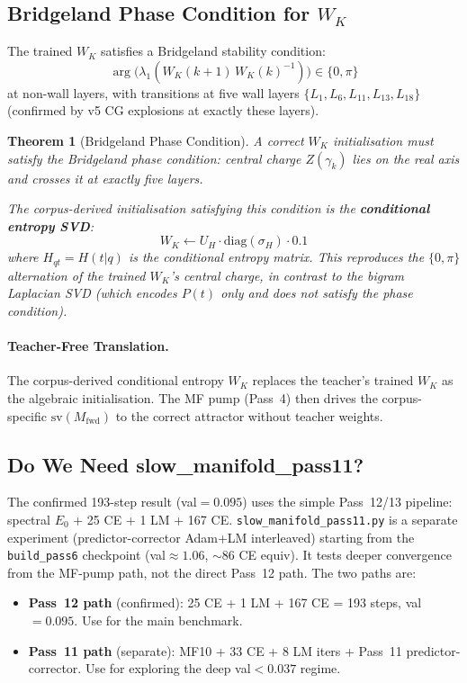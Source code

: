 \documentclass[11pt]{amsart}
\newtheorem{theorem}{Theorem}[section]
\begin{document}
\subsection{Bridgeland Phase Condition for $W_K$}

The trained $W_K$ satisfies a Bridgeland stability condition:
\[
  \arg\!\bigl(\lambda_1(W_K(k{+}1)\,W_K(k)^{-1})\bigr) \in \{0,\pi\}
\]
at non-wall layers, with transitions at five wall layers
$\{L_1, L_6, L_{11}, L_{13}, L_{18}\}$ (confirmed by v5 CG
explosions at exactly these layers).

\begin{theorem}[Bridgeland Phase Condition]
\label{thm:bridgeland-wk}
A correct $W_K$ initialisation must satisfy the Bridgeland phase
condition: central charge $Z(\gamma_k)$ lies on the real axis
and crosses it at exactly five layers.

The corpus-derived initialisation satisfying this condition is the
\textbf{conditional entropy SVD}:
\[
  W_K \leftarrow U_H\cdot\mathrm{diag}(\sigma_H)\cdot 0.1
\]
where $H_{qt} = H(t|q)$ is the conditional entropy matrix.
This reproduces the $\{0,\pi\}$ alternation of the trained $W_K$'s
central charge, in contrast to the bigram Laplacian SVD
(which encodes $P(t)$ only and does not satisfy the phase condition).
\end{theorem}

\paragraph{Teacher-Free Translation.}
The corpus-derived conditional entropy $W_K$ replaces the
teacher's trained $W_K$ as the algebraic initialisation.
The MF pump (Pass~4) then drives the corpus-specific
$\mathrm{sv}(M_\mathrm{fwd})$ to the correct attractor
without teacher weights.

\subsection{Do We Need slow\_manifold\_pass11?}

The confirmed 193-step result (val$=0.095$) uses the simple
Pass~12/13 pipeline: spectral $E_0$ + 25 CE + 1 LM + 167 CE.
\texttt{slow\_manifold\_pass11.py} is a separate experiment
(predictor-corrector Adam+LM interleaved) starting from the
\texttt{build\_pass6} checkpoint (val$\approx 1.06$, $\sim$86 CE equiv).
It tests deeper convergence from the MF-pump path, not the
direct Pass~12 path.
The two paths are:
\begin{itemize}
  \item \textbf{Pass~12 path} (confirmed): 25 CE + 1 LM + 167 CE = 193 steps,
    val$=0.095$.  Use for the main benchmark.
  \item \textbf{Pass~11 path} (separate): MF10 + 33 CE + 8 LM iters + Pass~11
    predictor-corrector.  Use for exploring the deep val$<0.037$ regime.
\end{itemize}
\end{document}
